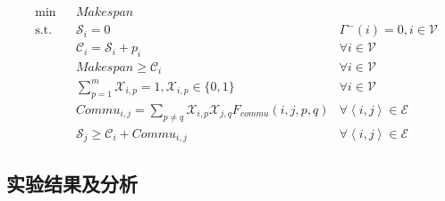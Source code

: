 \begin{align}
	& \text{min} & & \mathit{Makespan} \label{eq:p-target-2} & \\
	& \text{s.t.} & & \mathcal{S}_{i}=0 &\Gamma^{-}(i)=0, i\in \mathcal{V} \nonumber\\
	& & & \mathcal{C}_{i} = \mathcal{S}_{i} + \mathit{p}_i & \forall i\in \mathcal{V} \nonumber\\
	& & & \mathit{Makespan} \ge \mathcal{C}_{i} & \forall i\in \mathcal{V}\nonumber\\
	& & & \sum_{p=1}^{m} \mathcal{X}_{i,p}=1, \mathcal{X}_{i,p}\in\{0,1\} & \forall i\in \mathcal{V} \nonumber\\
	& & & \mathit{Commu}_{i,j} = \sum_{p\neq q}\mathcal{X}_{i,p}\mathcal{X}_{j,q}F_{\mathit{commu}}(i,j,p,q) & \forall \left\langle i,j\right\rangle \in \mathcal{E} \nonumber\\
	& & & \mathcal{S}_{j} \ge \mathcal{C}_{i} + \mathit{Commu}_{i,j}&\forall \left\langle i,j\right\rangle \in \mathcal{E} \nonumber
\end{align}





\subsection{实验结果及分析}


